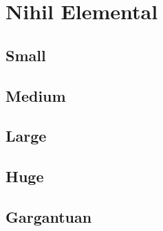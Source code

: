 \section{Nihil Elemental}

\subsection{Small}

\subsection{Medium}

\subsection{Large}

\subsection{Huge}

\subsection{Gargantuan}